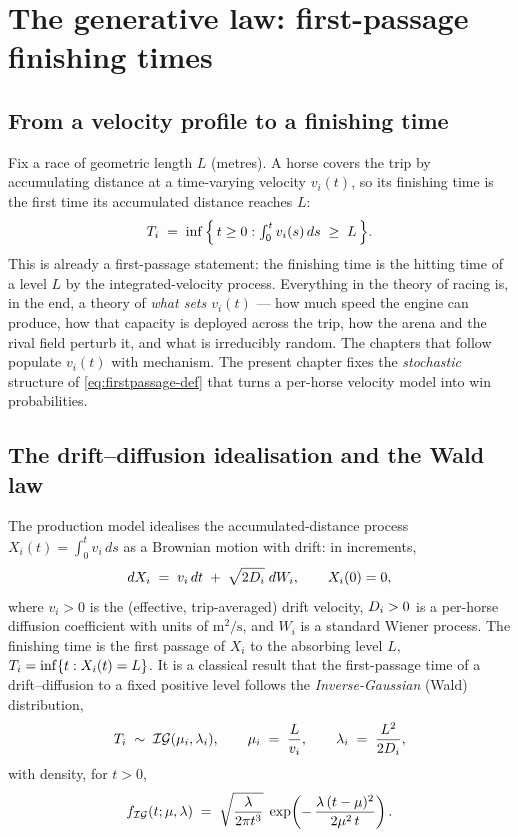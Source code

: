 \chapter{The generative law: first-passage finishing times}
\label{ch:gen}
\label{ch:generative}

\section{From a velocity profile to a finishing time}

Fix a race of geometric length $L$ (metres). A horse covers the trip by accumulating distance at
a time-varying velocity $v_i(t)$, so its finishing time is the first time its accumulated
distance reaches $L$:
\begin{equation}
  T_i \;=\; \inf\Big\{\, t \ge 0 : \textstyle\int_0^t v_i(s)\,ds \;\ge\; L \,\Big\}.
  \label{eq:firstpassage-def}
\end{equation}
This is already a first-passage statement: the finishing time is the hitting time of a level $L$
by the integrated-velocity process. Everything in the theory of racing is, in the end, a theory
of \emph{what sets $v_i(t)$} --- how much speed the engine can produce, how that capacity is
deployed across the trip, how the arena and the rival field perturb it, and what is irreducibly
random. The chapters that follow populate $v_i(t)$ with mechanism. The present chapter fixes the
\emph{stochastic} structure of \eqref{eq:firstpassage-def} that turns a per-horse velocity model
into win probabilities.

\section{The drift--diffusion idealisation and the Wald law}

The production model idealises the accumulated-distance process $X_i(t) = \int_0^t v_i\,ds$ as a
Brownian motion with drift: in increments,
\begin{equation}
  dX_i \;=\; v_i\, dt \;+\; \sqrt{2D_i}\; dW_i,
  \qquad X_i(0)=0,
  \label{eq:sde}
\end{equation}
where $v_i>0$ is the (effective, trip-averaged) drift velocity, $D_i>0$ is a per-horse
diffusion coefficient with units of $\mathrm{m^2/s}$, and $W_i$ is a standard Wiener process. The
finishing time is the first passage of $X_i$ to the absorbing level $L$,
$T_i = \inf\{t : X_i(t)=L\}$. It is a classical result that the first-passage time of a
drift--diffusion to a fixed positive level follows the \emph{Inverse-Gaussian} (Wald)
distribution,
\begin{equation}
  T_i \;\sim\; \mathcal{IG}(\mu_i,\lambda_i),
  \qquad
  \mu_i \;=\; \frac{L}{v_i},
  \qquad
  \lambda_i \;=\; \frac{L^2}{2D_i},
  \label{eq:wald-params}
\end{equation}
with density, for $t>0$,
\begin{equation}
  f_{\mathcal{IG}}(t;\mu,\lambda)
   \;=\; \sqrt{\frac{\lambda}{2\pi t^{3}}}\;
   \exp\!\left(-\,\frac{\lambda\,(t-\mu)^2}{2\mu^{2}\,t}\right).
  \label{eq:ig-density}
\end{equation}

